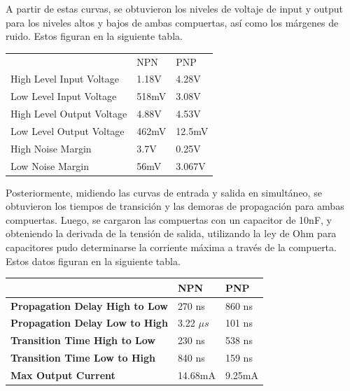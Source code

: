 A partir de estas curvas, se obtuvieron los niveles de voltaje de input y output para los niveles altos y bajos de ambas compuertas, as\'i como los m\'argenes de ruido. Estos figuran en la siguiente tabla.
\begin{center}
\begin{table}[H]
\begin{tabular}{|l|l|l|}
\hline
                          & NPN   & PNP    \\
High Level Input Voltage  & 1.18V & 4.28V  \\
Low Level Input Voltage   & 518mV & 3.08V  \\
High Level Output Voltage & 4.88V & 4.53V  \\
Low Level Output Voltage  & 462mV & 12.5mV \\
High Noise Margin         & 3.7V  & 0.25V  \\
Low Noise Margin          & 56mV  & 3.067V
\end{tabular}
\end{table}
\end{center}
Posteriormente, midiendo las curvas de entrada y salida en simult\'aneo, se obtuvieron los tiempos de transición y las demoras de propagación para ambas compuertas. Luego, se cargaron las compuertas con un capacitor de 10nF, y obteniendo la derivada de la tensión de salida, utilizando la ley de Ohm para capacitores pudo determinarse la corriente m\'axima a trav\'es de la compuerta. Estos datos figuran en la siguiente tabla.
\begin{center}
\begin{table}[H]
\begin{tabular}{|l|l|l|}
\hline
                                       & \textbf{NPN} & \textbf{PNP} \\ \hline
\textbf{Propagation Delay High to Low} & 270 ns       & 860 ns       \\ \hline
\textbf{Propagation Delay Low to High} & 3.22 $\mu s$      & 101 ns       \\ \hline
\textbf{Transition Time High to Low}   & 230 ns       & 538 ns       \\ \hline
\textbf{Transition Time Low to High}   & 840 ns       & 159 ns       \\ \hline
\textbf{Max Output Current}            & 14.68mA      & 9.25mA       \\ \hline
\end{tabular}
\end{table}
\end{center}

